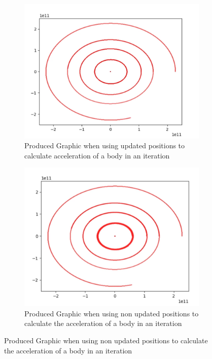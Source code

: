 \documentclass{article}
\begin{document}
                \begin{figure}[!b]
                    \centering
                    \begin{subfigure}{0.5\textwidth}
                        \centering
                        \includegraphics[width=\linewidth]{Figures/InnerPlanetsWhereCopyIsNotUsed.png}
                        \caption{Produced Graphic when using updated positions to \\calculate acceleration of a body in an iteration}
                        \label{subFig:nonCopy}
                    \end{subfigure}%
                    \begin{subfigure}{0.5\textwidth}
                        \centering
                        \includegraphics[width=1\linewidth]{Figures/InnerPlanetsWhereCopyIsUsed.png}
                        \caption{Produced Graphic when using non updated positions to calculate the acceleration of a body in an iteration}
                        \label{subFig:Copy}
                    \end{subfigure}    
                    

\end{figure}
\end{document}
